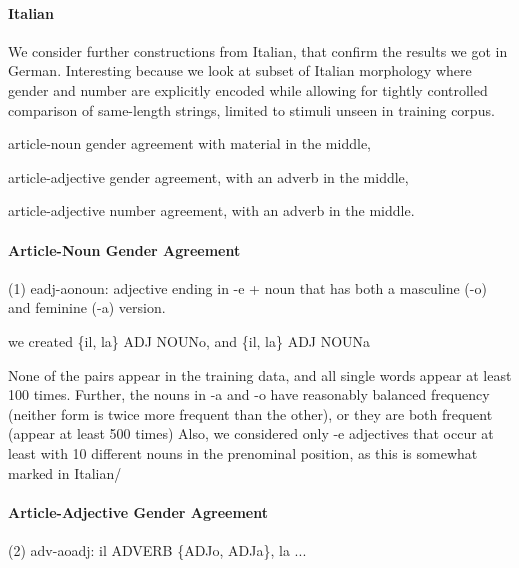 %

\paragraph{Italian} We consider further constructions from Italian,
that confirm the results we got in German. Interesting because we look
at subset of Italian morphology where gender and number are explicitly
encoded while allowing for tightly controlled comparison of
same-length strings, limited to stimuli unseen in training corpus.
\begin{inparaenum}[i)]
\item article-noun gender agreement with material in the middle,
\item article-adjective gender agreement, with an adverb in the middle,
\item article-adjective number agreement, with an adverb in the middle.
\end{inparaenum}

\paragraph{Article-Noun Gender Agreement}
(1) eadj-aonoun: adjective ending in -e + noun that has both a masculine (-o) and feminine (-a) version.

we created \{il, la\} ADJ NOUNo, and \{il, la\} ADJ NOUNa

None of the pairs appear in the training data, and all single words appear at least 100 times.
Further, the nouns in -a and  -o have reasonably balanced frequency (neither form is twice more frequent than the other), or they are both frequent (appear at least 500 times)
Also, we considered only -e adjectives that occur at least with 10 different nouns in the prenominal position, as this is somewhat marked in Italian/


\paragraph{Article-Adjective Gender Agreement}
(2) adv-aoadj: il ADVERB \{ADJo, ADJa\}, la ...

